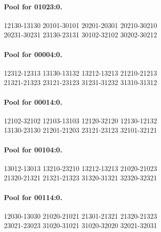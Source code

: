 \documentclass[11pt]{article}
\theoremstyle{remark}
\numberwithin{equation}{section}
\begin{document}
\paragraph{Pool for 01023:0.}
\begingroup\footnotesize\ttfamily\begin{flushleft}
12130-13130 20101-30101 20201-20301 20210-30210\\
20231-30231 23130-23131 30102-32102 30202-30212\\
\end{flushleft}\endgroup
\paragraph{Pool for 00004:0.}
\begingroup\footnotesize\ttfamily\begin{flushleft}
12312-12313 13130-13132 13212-13213 21210-21213\\
21321-21323 23121-23123 31231-31232 31310-31312\\
\end{flushleft}\endgroup
\paragraph{Pool for 00014:0.}
\begingroup\footnotesize\ttfamily\begin{flushleft}
12102-32102 12103-13103 12120-32120 12130-12132\\
13130-23130 21201-21203 23121-23123 32101-32121\\
\end{flushleft}\endgroup
\paragraph{Pool for 00104:0.}
\begingroup\footnotesize\ttfamily\begin{flushleft}
13012-13013 13210-23210 13212-13213 21020-21023\\
21320-21321 21321-21323 31320-31321 32320-32321\\
\end{flushleft}\endgroup
\paragraph{Pool for 00114:0.}
\begingroup\footnotesize\ttfamily\begin{flushleft}
12030-13030 21020-21021 21301-21321 21320-21323\\
23021-23023 31020-31021 31020-32020 32021-32031\\
\end{flushleft}\endgroup
\end{document}
